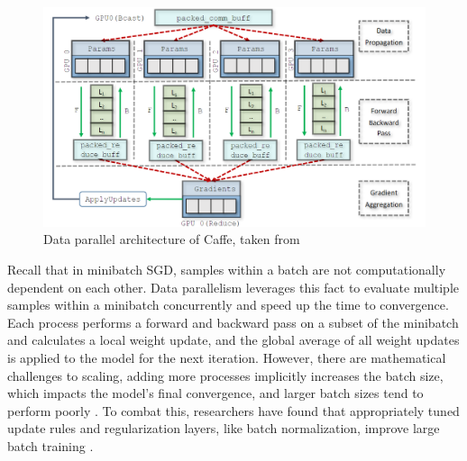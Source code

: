 \begin{figure}
    \centering
    \includegraphics[width=15cm]{3_Chapters/3_Chapter_DistributedDL/Figs/Caffee_DP_arch.png}
    \caption{Data parallel architecture of Caffe, taken from \cite{Awan2017InDepthPerfCharOfDNN}}
    \label{fig:caffe-dp-arch}
\end{figure}

Recall that in minibatch SGD, samples within a batch are not computationally dependent on each other.
Data parallelism leverages this fact to evaluate multiple samples within a minibatch concurrently and speed up the time to convergence.
Each process performs a forward and backward pass on a subset of the minibatch and calculates a local weight update, and the global average of all weight updates is applied to the model for the next iteration.
However, there are mathematical challenges to scaling, adding more processes implicitly increases the batch size, which impacts the model's final convergence, and larger batch sizes tend to perform poorly \cite{Keskar2016LargeBatchTraining}.
To combat this, researchers have found that appropriately tuned update rules and regularization layers, like batch normalization, improve large batch training \cite{You2018ImgNetInMin, Goyal2017FacebookImgNet1Hour}. 

